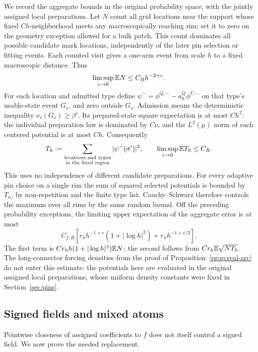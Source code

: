 We record the aggregate bounds in the original probability space,
with the jointly assigned local preparations. Let $N$ count all grid
locations near the support whose fixed $Ch$-neighborhood meets any
macroscopically reaching rim; set it to zero on the geometry exception
allowed for a bulk patch. This count dominates all possible candidate
mark locations, independently of the later pin selection or fitting
events. Each counted visit gives a one-arm event from scale $h$ to
a fixed macroscopic distance. Thus
\[
                 \limsup_{\varepsilon\to0}\mathbb E N\le C_R h^{-2+c}.
\]
For each location and admitted type define
$\psi^- =\phi^{Q,-}-a_h^Q\phi^{V,-}$ on that type's usable-state
event $G_s$, and zero outside $G_s$. Admission means the deterministic
inequality $\nu_s(G_s)\ge\beta'$. Its prepared-state square expectation is at most $Ch^2$:
the individual preparation law is dominated by $C\nu$, and the
$L^2(\mu)$ norm of each centered potential is at most $Ch$.
Consequently
\[
 T_h:=\sum_{\substack{\text{locations and types}\\
                         \text{in the fixed region}}}
              |\psi^-(\sigma')|^2,
       \qquad \limsup_{\varepsilon\to0}\mathbb E T_h\le C_R.
\]
This uses no independence of different candidate preparations.
For every adaptive pin choice on a single rim the sum of squared
selected potentials is bounded by $T_h$, by non-repetition and the
finite type list.  Cauchy--Schwarz therefore controls the maximum
over all rims by the same random bound.  Off the preceding
probability exceptions, the limiting upper expectation of the
aggregate error is at most
\begin{equation}\label{actual:coefficient-cost}
 C_{f,R}\left[
 r_hh^{-1+c}(1+|\log h|^2)+r_hh^{-1+c/2}\right].
\end{equation}
The first term is $C r_hh(1+|\log h|^2)\mathbb E N$; the second follows
from $Cr_h\mathbb E\sqrt{NT_h}$.  The long-connector forcing densities
from the proof of Proposition~\ref{prop:real-arc} do not enter this
estimate: the potentials here are evaluated in the original assigned
local preparations, whose uniform density constants were fixed in
Section~\ref{sec:pins}.

\subsection{Signed fields and mixed atoms}

Pointwise closeness of assigned coefficients to $f$ does not itself
control a signed field.  We now prove the needed replacement.

